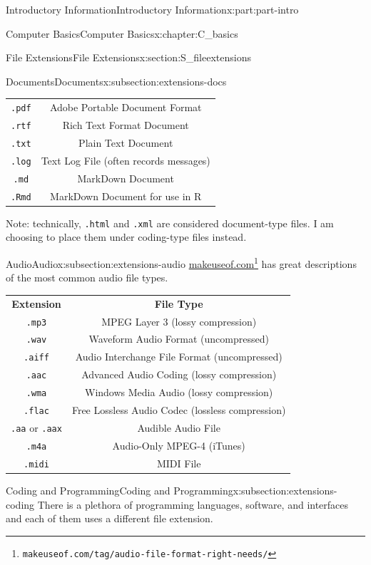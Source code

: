 \documentclass[oneside,10pt,]{book}
\newcommand{\tabularfont}{\relax}
\newcommand{\mono}[1]{\texttt{#1}}
\begin{document}
\begin{partptx}{Introductory Information}{}{Introductory Information}{}{}{x:part:part-intro}
\begin{chapterptx}{Computer Basics}{}{Computer Basics}{}{}{x:chapter:C_basics}
\begin{sectionptx}{File Extensions}{}{File Extensions}{}{}{x:section:S_fileextensions}
\begin{subsectionptx}{Documents}{}{Documents}{}{}{x:subsection:extensions-docs}
\begin{center}
{\begin{tabular}{cc}
\mono{.pdf}&Adobe Portable Document Format\tabularnewline[0pt]
\mono{.rtf}&Rich Text Format Document\tabularnewline[0pt]
\mono{.txt}&Plain Text Document\tabularnewline[0pt]
\mono{.log}&Text Log File (often records messages)\tabularnewline[0pt]
\mono{.md}&MarkDown Document\tabularnewline[0pt]
\mono{.Rmd}&MarkDown Document for use in R
\end{tabular}
}%
\end{center}%
Note: technically, \mono{.html} and \mono{.xml} are considered document-type files. I am choosing to place them under coding-type files instead.%
\end{subsectionptx}
%
%
\typeout{************************************************}
\typeout{************************************************}
%
\begin{subsectionptx}{Audio}{}{Audio}{}{}{x:subsection:extensions-audio}
%
\href{https://www.makeuseof.com/tag/audio-file-format-right-needs/}{makeuseof.com}\footnote{\nolinkurl{makeuseof.com/tag/audio-file-format-right-needs/}\label{g:fn:idp615297432}} has great descriptions of the most common audio file types.%
\begin{center}%
{\tabularfont%
\begin{tabular}{cc}
\textbf{Extension}&\textbf{File Type}\tabularnewline[0pt]
\mono{.mp3}&MPEG Layer 3 (lossy compression)\tabularnewline[0pt]
\mono{.wav}&Waveform Audio Format (uncompressed)\tabularnewline[0pt]
\mono{.aiff}&Audio Interchange File Format (uncompressed)\tabularnewline[0pt]
\mono{.aac}&Advanced Audio Coding (lossy compression)\tabularnewline[0pt]
\mono{.wma}&Windows Media Audio (lossy compression)\tabularnewline[0pt]
\mono{.flac}&Free Lossless Audio Codec (lossless compression)\tabularnewline[0pt]
\mono{.aa} or \mono{.aax}&Audible Audio File\tabularnewline[0pt]
\mono{.m4a}&Audio-Only MPEG-4 (iTunes)\tabularnewline[0pt]
\mono{.midi}&MIDI File
\end{tabular}
}%
\end{center}%
\end{subsectionptx}
%
%
\typeout{************************************************}
\typeout{************************************************}
%
\begin{subsectionptx}{Coding and Programming}{}{Coding and Programming}{}{}{x:subsection:extensions-coding}
%
There is a plethora of programming languages, software, and interfaces and each of them uses a different file extension.%

\end{subsectionptx}
\end{sectionptx}
\end{chapterptx}
\end{partptx}
\end{document}
